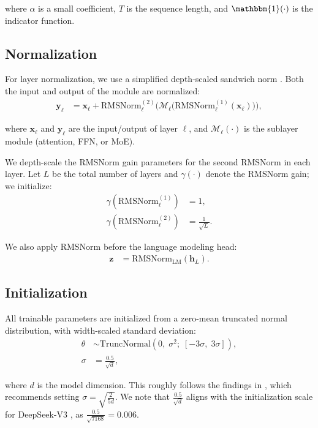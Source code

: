 \documentclass{article}
\begin{document}
where $\alpha$ is a small coefficient, $T$ is the sequence length, and $\mathbbm{1}(\cdot)$ is the indicator function.

\subsection{Normalization}
For layer normalization, we use a simplified depth-scaled sandwich norm \citep{yin2025panguultrapushinglimits, ding2021cogviewmasteringtexttoimagegeneration, kim2025perilnrevisitingnormalizationlayer}. Both the input and output of the module are normalized:
\begin{align}
\mathbf{y}_\ell
&=
\mathbf{x}_\ell
+
\mathrm{RMSNorm}^{(2)}_\ell\!\Big(
\mathcal{M}_\ell\big(
\mathrm{RMSNorm}^{(1)}_\ell(\mathbf{x}_\ell)
\big)
\Big),
\tag{33}
\end{align}

where $\mathbf{x}_\ell$ and $\mathbf{y}_\ell$ are the input/output of layer $\ell$, and $\mathcal{M}_\ell(\cdot)$ is the sublayer module (attention, FFN, or MoE).

We depth-scale the RMSNorm gain parameters for the second RMSNorm in each layer.
Let $L$ be the total number of layers and $\gamma(\cdot)$ denote the RMSNorm gain; we initialize:
\begin{align}
\gamma\!\left(\mathrm{RMSNorm}^{(1)}_\ell\right)
&=
1,
\tag{34}\\
\gamma\!\left(\mathrm{RMSNorm}^{(2)}_\ell\right)
&=
\frac{1}{\sqrt{L}}.
\tag{35}
\end{align}

We also apply RMSNorm before the language modeling head:
\begin{align}
\mathbf{z}
&=
\mathrm{RMSNorm}_{\mathrm{LM}}(\mathbf{h}_L).
\tag{36}
\end{align}

\subsection{Initialization}
All trainable parameters are initialized from a zero-mean truncated normal distribution, with width-scaled standard deviation:
\begin{align}
\theta &\sim \mathrm{TruncNormal}\!\left(0,\;\sigma^2;\;[-3\sigma,\;3\sigma]\right),
\tag{37}\\
\sigma &= \frac{0.5}{\sqrt{d}},
\tag{38}
\end{align}

where $d$ is the model dimension. This roughly follows the findings in \cite{takase2025spikemorestabilizingpretraining}, which recommends setting $\sigma = \sqrt{\frac{2}{5d}}$. We note that $\frac{0.5}{\sqrt{d}}$ aligns with the initialization scale for DeepSeek-V3 \citep{deepseekai2025deepseekv3technicalreport}, as $\frac{0.5}{\sqrt{7168}}=0.006$.
\end{document}
